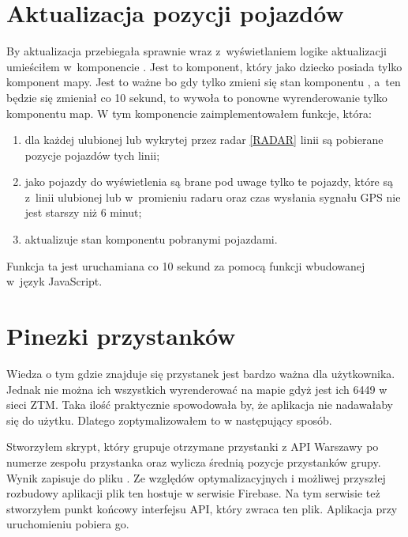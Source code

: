 \documentclass{SGGW-thesis}
\begin{document}
\section{Aktualizacja pozycji pojazdów}
By aktualizacja przebiegała sprawnie wraz z~wyświetlaniem logike aktualizacji umieściłem w~komponencie .
Jest to komponent, który jako dziecko posiada tylko komponent mapy.
Jest to ważne bo gdy tylko zmieni się stan komponentu , a~ten będzie się zmieniał co 10 sekund, to wywoła to ponowne wyrenderowanie tylko komponentu map.
W tym komponencie zaimplementowałem funkcje, która:
\begin{enumerate}
  \item{dla każdej ulubionej lub wykrytej przez radar \ref{RADAR} linii są pobierane pozycje pojazdów tych linii;}
  \item{jako pojazdy do wyświetlenia są brane pod uwage tylko te pojazdy, które są z~linii ulubionej lub w~promieniu radaru oraz czas wysłania sygnału GPS nie jest starszy niż 6 minut;}
  \item{aktualizuje stan komponentu  pobranymi pojazdami.}
\end{enumerate}
Funkcja ta jest uruchamiana co 10 sekund za pomocą funkcji  wbudowanej w~język JavaScript.

\section{Pinezki przystanków}
Wiedza o tym gdzie znajduje się przystanek jest bardzo ważna dla użytkownika.
Jednak nie można ich wszystkich wyrenderować na mapie gdyż jest ich 6449 w sieci ZTM.
Taka ilość praktycznie spowodowała by, że aplikacja nie nadawałaby się do użytku.
Dlatego zoptymalizowałem to w następujący sposób.

\label{FIREBASE}
Stworzyłem skrypt, który grupuje otrzymane przystanki z API Warszawy po numerze zespołu przystanka oraz wylicza średnią pozycje przystanków grupy.
Wynik zapisuje do pliku .
Ze względów optymalizacyjnych i możliwej przyszłej rozbudowy aplikacji plik ten hostuje w serwisie Firebase.
Na tym serwisie też stworzyłem punkt końcowy interfejsu API, który zwraca ten plik.
Aplikacja przy uruchomieniu pobiera go.
\end{document}
